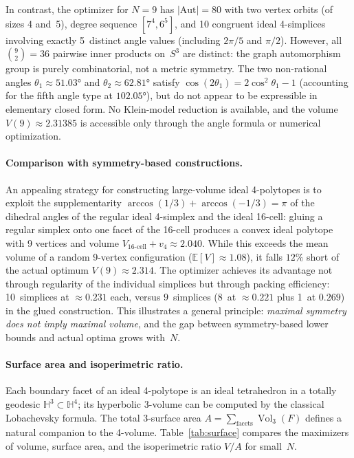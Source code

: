 \documentclass[11pt]{article}
\begin{document}
In contrast, the optimizer for $N = 9$ has $|\mathrm{Aut}| = 80$
with two vertex orbits (of sizes 4 and~5), degree sequence
$[7^4, 6^5]$, and 10 congruent ideal 4-simplices involving
exactly 5~distinct angle values (including $2\pi/5$ and $\pi/2$).
However, all $\binom{9}{2} = 36$ pairwise inner products on~$S^3$
are distinct: the graph automorphism group is purely combinatorial,
not a metric symmetry.  The two non-rational angles
$\theta_1 \approx 51.03°$ and $\theta_2 \approx 62.81°$ satisfy
$\cos(2\theta_1) = 2\cos^2\theta_1 - 1$ (accounting for the
fifth angle type at $102.05°$), but do not appear to be
expressible in elementary closed form.  No Klein-model reduction
is available, and the volume $V(9) \approx 2.31385$ is accessible
only through the angle formula or numerical optimization.

\paragraph{Comparison with symmetry-based constructions.}
An appealing strategy for constructing large-volume ideal
4-polytopes is to exploit the supplementarity
$\arccos(1/3) + \arccos(-1/3) = \pi$ of the dihedral angles of
the regular ideal 4-simplex and the ideal 16-cell: gluing a
regular simplex onto one facet of the 16-cell produces a convex
ideal polytope with 9 vertices and volume
$V_{\mathrm{16\text{-}cell}} + v_4 \approx 2.040$.  While this
exceeds the mean volume of a random 9-vertex configuration
($\mathbb{E}[V] \approx 1.08$), it falls $12\%$ short of the
actual optimum $V(9) \approx 2.314$.  The optimizer achieves its
advantage not through regularity of the individual simplices but
through packing efficiency: 10~simplices at
$\approx 0.231$ each, versus $9$~simplices (8~at
$\approx 0.221$ plus 1~at $0.269$) in the glued construction.
This illustrates a general principle: \emph{maximal symmetry does
not imply maximal volume}, and the gap between symmetry-based
lower bounds and actual optima grows with~$N$.

\paragraph{Surface area and isoperimetric ratio.}
Each boundary facet of an ideal 4-polytope is an ideal tetrahedron
in a totally geodesic $\mathbb{H}^3 \subset \mathbb{H}^4$; its
hyperbolic 3-volume can be computed by the classical Lobachevsky
formula.  The total 3-surface area
$A = \sum_{\text{facets}} \operatorname{Vol}_3(F)$ defines a
natural companion to the 4-volume.
Table~\ref{tab:surface} compares the maximizers of volume, surface
area, and the isoperimetric ratio $V/A$ for small~$N$.
\end{document}
